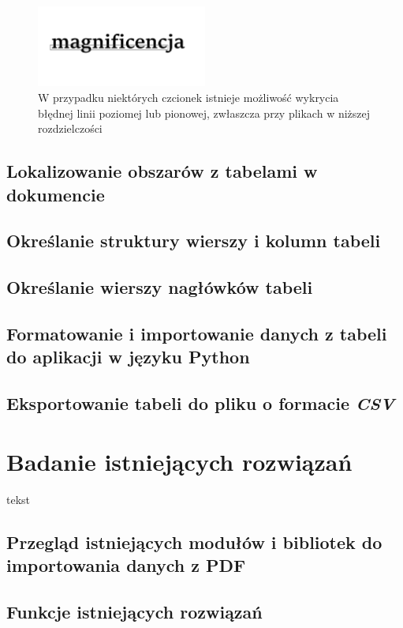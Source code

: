 \documentclass[a4paper,twoside,12pt]{book}
\begin{document}
\begin{figure}
\centering
\includegraphics[width=0.5\textwidth]{./images/caligraphy.png}
\caption{W przypadku niektórych czcionek istnieje możliwość wykrycia błędnej linii poziomej lub pionowej, zwłaszcza przy plikach w niższej rozdzielczości}
\label{fig:pdf_logo}
\end{figure}


\section{Lokalizowanie obszarów z tabelami w dokumencie}
\section{Określanie struktury wierszy i kolumn tabeli}
\section{Określanie wierszy nagłówków tabeli}
\section{Formatowanie i importowanie danych z tabeli do aplikacji w języku Python}
\section{Eksportowanie tabeli do pliku o formacie \emph{CSV}}

\chapter{Badanie istniejących rozwiązań} 

tekst

\section{Przegląd istniejących modułów i bibliotek do importowania danych z PDF}

\section{Funkcje istniejących rozwiązań}
\end{document}

